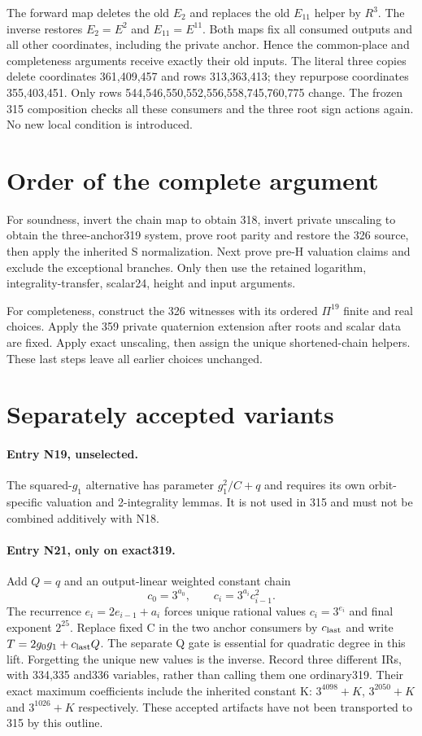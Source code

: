 \documentclass{article}
\begin{document}
The forward map deletes the old $E_2$ and replaces the old $E_{11}$
helper by $R^3$. The inverse restores $E_2=E^2$ and $E_{11}=E^{11}$.
Both maps fix all consumed outputs and all other coordinates, including
the private anchor. Hence the common-place and completeness arguments
receive exactly their old inputs. The literal three copies delete
coordinates 361,409,457 and rows 313,363,413; they repurpose coordinates
355,403,451. Only rows 544,546,550,552,556,558,745,760,775 change.
The frozen 315 composition checks all these consumers and the three root
sign actions again. No new local condition is introduced.

\section{Order of the complete argument}
\label{outline:composition}
For soundness, invert the chain map to obtain 318, invert private
unscaling to obtain the three-anchor319 system, prove root parity and
restore the 326 source, then apply the inherited S normalization.
Next prove pre-H valuation claims and exclude the exceptional branches.
Only then use the retained logarithm, integrality-transfer, scalar24,
height and input arguments.

For completeness, construct the 326 witnesses with its ordered
$\Pi^{19}$ finite and real choices. Apply the 359 private quaternion
extension after roots and scalar data are fixed. Apply exact unscaling,
then assign the unique shortened-chain helpers. These last steps leave
all earlier choices unchanged.

\section{Separately accepted variants}
\label{outline:variants}
\paragraph{Entry N19, unselected.}
The squared-$g_1$ alternative has parameter $g_1^2/C+q$ and requires its
own orbit-specific valuation and 2-integrality lemmas. It is not used in
315 and must not be combined additively with N18.

\paragraph{Entry N21, only on exact319.}
Add $Q=q$ and an output-linear weighted constant chain
\[
 c_0=3^{a_0},\qquad c_i=3^{a_i}c_{i-1}^2.
\]
The recurrence $e_i=2e_{i-1}+a_i$ forces unique rational values
$c_i=3^{e_i}$ and final exponent $2^{25}$. Replace fixed C in the two
anchor consumers by $c_{\rm last}$ and write $T=2g_0g_1+c_{\rm last}Q$.
The separate Q gate is essential for quadratic degree in this lift.
Forgetting the unique new values is the inverse. Record three different
IRs, with 334,335 and336 variables, rather than calling them one ordinary319.
Their exact maximum coefficients include the inherited constant K:
$3^{4098}+K$, $3^{2050}+K$ and $3^{1026}+K$ respectively.
These accepted artifacts have not been transported to 315 by this outline.
\end{document}
